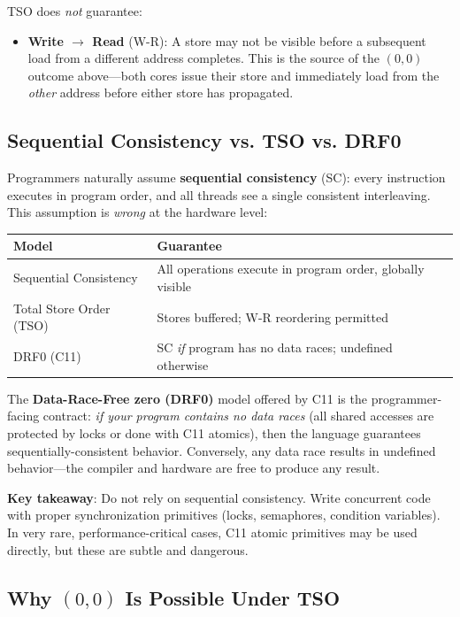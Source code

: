 \documentclass[11pt]{article}
\begin{document}
TSO does \emph{not} guarantee:
\begin{itemize}
    \item \textbf{Write $\to$ Read} (W-R): A store may not be visible before a subsequent load from a different address completes. This is the source of the $(0, 0)$ outcome above---both cores issue their store and immediately load from the \emph{other} address before either store has propagated.
\end{itemize}

\subsection{Sequential Consistency vs. TSO vs. DRF0}

Programmers naturally assume \textbf{sequential consistency} (SC): every instruction executes in program order, and all threads see a single consistent interleaving. This assumption is \emph{wrong} at the hardware level:

\begin{center}
\begin{tabular}{ll}
\toprule
\textbf{Model} & \textbf{Guarantee} \\
\midrule
Sequential Consistency & All operations execute in program order, globally visible \\
Total Store Order (TSO) & Stores buffered; W-R reordering permitted \\
DRF0 (C11) & SC \emph{if} program has no data races; undefined otherwise \\
\bottomrule
\end{tabular}
\end{center}

The \textbf{Data-Race-Free zero (DRF0)} model offered by C11 is the programmer-facing contract: \emph{if your program contains no data races} (all shared accesses are protected by locks or done with C11 atomics), then the language guarantees sequentially-consistent behavior. Conversely, any data race results in undefined behavior---the compiler and hardware are free to produce any result.

\textbf{Key takeaway}: Do not rely on sequential consistency. Write concurrent code with proper synchronization primitives (locks, semaphores, condition variables). In very rare, performance-critical cases, C11 atomic primitives may be used directly, but these are subtle and dangerous.

\subsection{Why $(0, 0)$ Is Possible Under TSO}
\end{document}

